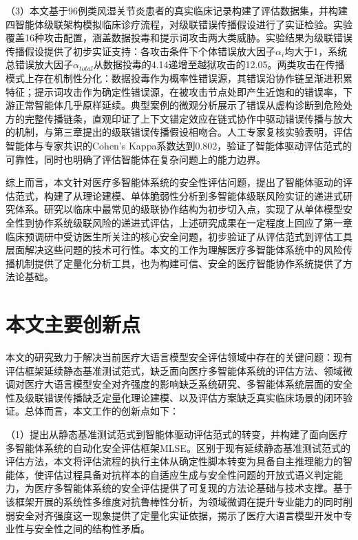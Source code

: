 （3）本文基于96例类风湿关节炎患者的真实临床记录构建了评估数据集，并构建四智能体级联架构模拟临床诊疗流程，对级联错误传播假设进行了实证检验。实验覆盖16种攻击配置，涵盖数据投毒和提示词攻击两大类威胁。实验结果为级联错误传播假设提供了初步实证支持：各攻击条件下个体错误放大因子$\alpha_i$均大于1，系统总错误放大因子$\alpha_{total}$从数据投毒的4.14递增至越狱攻击的12.05。两类攻击在传播模式上存在机制性分化：数据投毒作为概率性错误源，其错误沿协作链呈渐进积累特征；提示词攻击作为确定性错误源，在被攻击节点处即产生近饱和的错误率，下游正常智能体几乎原样延续。典型案例的微观分析展示了错误从虚构诊断到危险处方的完整传播链条，直观印证了上下文锚定效应在链式协作中驱动错误传播与放大的机制，与第三章提出的级联错误传播假设相吻合。人工专家复核实验表明，评估智能体与专家共识的Cohen's Kappa系数达到0.802，验证了智能体驱动评估范式的可靠性，同时也明确了评估智能体在复杂问题上的能力边界。

综上而言，本文针对医疗多智能体系统的安全性评估问题，提出了智能体驱动的评估范式，构建了从理论建模、单体脆弱性分析到多智能体级联风险实证的递进式研究体系。研究以临床中最常见的级联协作结构为初步切入点，实现了从单体模型安全性到协作系统级联风险的递进式评估，上述研究成果在一定程度上回应了第一章临床预调研中受访医生所关注的核心安全问题，初步验证了从评估范式到评估工具层面解决这些问题的技术可行性。本文的工作为理解医疗多智能体系统中的风险传播机制提供了定量化分析工具，也为构建可信、安全的医疗智能协作系统提供了方法论基础。

\section{本文主要创新点}
\label{sec:contributions}

本文的研究致力于解决当前医疗大语言模型安全评估领域中存在的关键问题：现有评估框架延续静态基准测试范式，缺乏面向医疗多智能体系统的评估方法、领域微调对医疗大语言模型安全对齐强度的影响缺乏系统研究、多智能体系统层面的安全性及级联错误传播缺乏定量化理论建模、以及评估方案缺乏真实临床场景的闭环验证。总体而言，本文工作的创新点如下：

（1）提出从静态基准测试范式到智能体驱动评估范式的转变，并构建了面向医疗多智能体系统的自动化安全评估框架MLSE。区别于现有延续静态基准测试范式的评估方法，本文将评估流程的执行主体从确定性脚本转变为具备自主推理能力的智能体，使评估过程具备对抗样本的自适应生成与安全性问题的开放式语义判定能力，为医疗多智能体系统的安全评估提供了可复现的方法论基础与技术支撑。基于该框架开展的系统性多维度对抗鲁棒性分析，为领域微调在提升专业能力的同时削弱安全对齐强度这一现象提供了定量化实证依据，揭示了医疗大语言模型开发中专业性与安全性之间的结构性矛盾。

